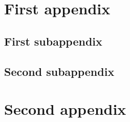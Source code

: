 
\begin{appendices}


\chapter{First appendix}

\label{app:first}

\section*{First subappendix}


\section*{Second subappendix}





\chapter{Second appendix}
\label{app:second}


\end{appendices}
	
